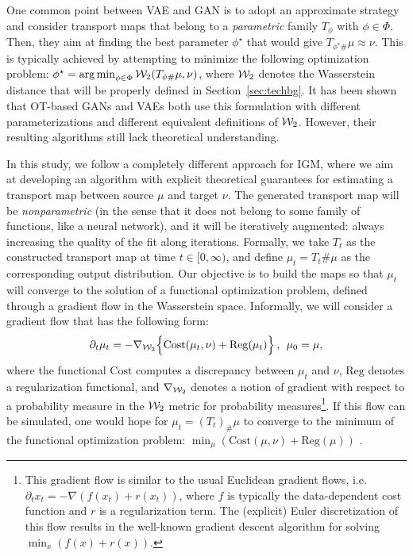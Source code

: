 One common point between VAE and GAN is to adopt an approximate strategy and consider transport maps that belong to a \emph{parametric} family $T_{\phi}$ with $\phi \in \Phi$. Then, they aim at finding the best parameter $\phi^\star$ that would give $T_{\phi^\star \#}\mu \approx \nu$. This is typically achieved by attempting to minimize the following optimization problem:
$\phi^\star = \operatorname*{arg\min}_{\phi \in \Phi} {\cal W}_2(T_{\phi \#}\mu, \nu)$,
where ${\cal W}_2$ denotes the Wasserstein distance that will be properly defined in Section~\ref{sec:techbg}. It has been shown that \cite{genevay2017gan} OT-based GANs \cite{arjovsky2017wasserstein} and VAEs \cite{tolstikhin2017wasserstein} both use this formulation with different parameterizations and different equivalent definitions of ${\cal W}_2$. However, their resulting algorithms still lack theoretical understanding.


In this study, we follow a completely different approach for IGM, where we aim at developing an algorithm with explicit theoretical guarantees for estimating a transport map between source $\mu$ and target $\nu$. The generated transport map  will be \textit{nonparametric} (in the sense that it does not belong to some family of functions, like a neural network), and it will be iteratively augmented: always increasing the quality of the fit along iterations. Formally, we take $T_t$ as the constructed transport map at time $t \in [0,\infty)$, and define $\mu_t=T_t \# \mu$ as the corresponding output distribution. Our objective is to build the maps so that $\mu_t$ will converge to the solution of a functional optimization problem, defined through a gradient flow in the Wasserstein space. Informally, we will consider a gradient flow that has the following form:
\begin{align}
\partial_t \mu_t = - \nabla_{{\cal W}_2} \Bigl\{ \mathrm{Cost}(\mu_t, \nu) + \mathrm{Reg}(\mu_t)\Bigr\} \, , \>\> \mu_0 = \mu,\label{eqn:gradflow}
\end{align}
where the functional $\mathrm{Cost}$ computes a discrepancy between $\mu_t$ and $\nu$, $\mathrm{Reg}$ denotes a regularization functional, and $\nabla_{{\cal W}_2}$ denotes a notion of gradient with respect to a probability measure in the ${\cal W}_2$ metric for probability measures\footnote{This gradient flow is similar to the usual Euclidean gradient flows, i.e.\ $\partial_t x_t = - \nabla (f(x_t) + r(x_t))$, where $f$ is typically the data-dependent cost function and $r$ is a regularization term. The (explicit) Euler discretization of this flow results in the well-known gradient descent algorithm for solving $\min_x (f(x)+r(x))$.}. If this flow can be simulated, one would hope for $\mu_t=(T_t)_{\#}\mu$ to converge to the minimum of the functional optimization problem: $\min_\mu ( \mathrm{Cost}(\mu, \nu) + \mathrm{Reg}(\mu))$ \cite{ambrosio2008gradient,santambrogio2017euclidean}.


